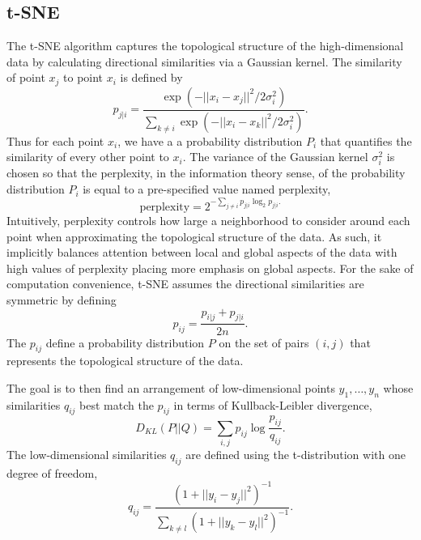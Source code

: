 \documentclass{article}
\begin{document}
\subsection{t-SNE}
The t-SNE algorithm captures the topological structure of the high-dimensional data by calculating directional similarities via a Gaussian kernel. The similarity of point $x_j$ to point $x_i$ is defined by $$p_{j|i} = \frac{\exp(-||x_i - x_j||^2/2\sigma_i^2)}{\sum_{k \neq i} \exp(-||x_i-x_k||^2/2\sigma_i^2)}.$$ Thus for each point $x_i$, we have a a probability distribution $P_i$ that quantifies the similarity of every other point to $x_i$. The variance of the Gaussian kernel $\sigma_i^2$ is chosen so that the perplexity, in the information theory sense, of the probability distribution $P_i$ is equal to a pre-specified value named perplexity, $$\textrm{perplexity} = 2^{-\sum_{j \neq i} p_{j|i}\log_2 p_{j|i}.}$$ Intuitively, perplexity controls how large a neighborhood to consider around each point when approximating the topological structure of the data. As such, it implicitly balances attention between local and global aspects of the data with high values of perplexity placing more emphasis on global aspects. For the sake of computation convenience, t-SNE assumes the directional similarities are symmetric by defining $$p_{ij} = \frac{p_{i|j} + p_{j|i}}{2n}.$$ The $p_{ij}$ define a probability distribution $P$ on the set of pairs $(i,j)$ that represents the topological structure of the data.

\bigbreak The goal is to then find an arrangement of low-dimensional points $y_1, \hdots, y_n$ whose similarities $q_{ij}$ best match the $p_{ij}$ in terms of Kullback-Leibler divergence, $$D_{KL}(P || Q) = \sum_{i,j} p_{ij} \log \frac{p_{ij}}{q_{ij}}.$$ The low-dimensional similarities $q_{ij}$ are defined using the t-distribution with one degree of freedom, $$q_{ij} = \frac{(1 + ||y_i - y_j||^2)^{-1}}{ \sum_{k \neq l} (1 + ||y_k - y_l||^2)^{-1}}.$$
\end{document}
